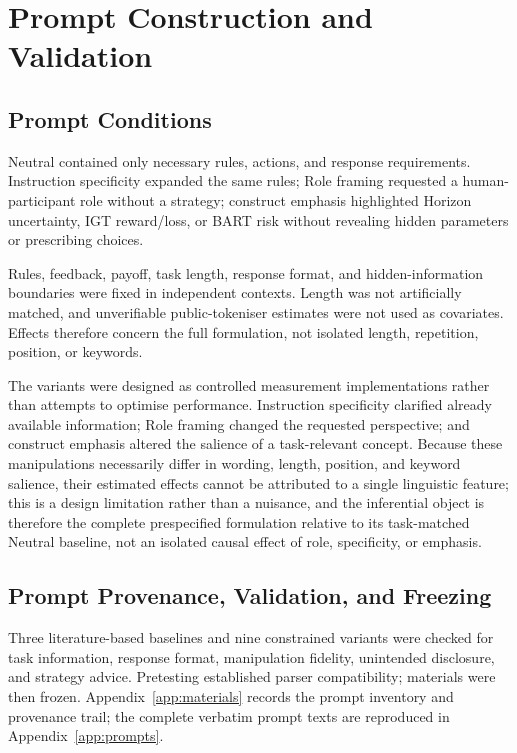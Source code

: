 \documentclass[logo,msc,inf]{infthesis}       %
\begin{document}
\section{Prompt Construction and Validation}

\subsection{Prompt Conditions}

Neutral contained only necessary rules, actions, and response requirements. Instruction specificity expanded the same rules; Role framing requested a human-participant role without a strategy; construct emphasis highlighted Horizon uncertainty, IGT reward/loss, or BART risk without revealing hidden parameters or prescribing choices.

Rules, feedback, payoff, task length, response format, and hidden-information boundaries were fixed in independent contexts. Length was not artificially matched, and unverifiable public-tokeniser estimates were not used as covariates. Effects therefore concern the full formulation, not isolated length, repetition, position, or keywords.

The variants were designed as controlled measurement implementations rather than attempts to optimise performance. Instruction specificity clarified already available information; Role framing changed the requested perspective; and construct emphasis altered the salience of a task-relevant concept. Because these manipulations necessarily differ in wording, length, position, and keyword salience, their estimated effects cannot be attributed to a single linguistic feature; this is a design limitation rather than a nuisance, and the inferential object is therefore the complete prespecified formulation relative to its task-matched Neutral baseline, not an isolated causal effect of role, specificity, or emphasis.

\subsection{Prompt Provenance, Validation, and Freezing}

Three literature-based baselines and nine constrained variants were checked for task information, response format, manipulation fidelity, unintended disclosure, and strategy advice. Pretesting established parser compatibility; materials were then frozen. Appendix~\ref{app:materials} records the prompt inventory and provenance trail; the complete verbatim prompt texts are reproduced in Appendix~\ref{app:prompts}.
\end{document}
